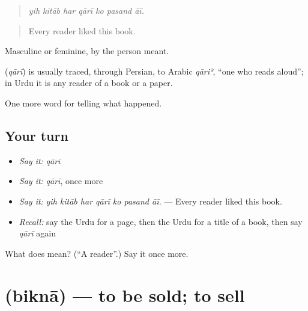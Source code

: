 \begin{quote}
      
\end{quote}

\begin{quote}
\emph{yih kitāb har qārī ko pasand āī.}
\end{quote}

\begin{quote}
Every reader liked this book.
\end{quote}

Masculine or feminine, by the person meant.

\begin{cousinweb}
\textbf{} (\emph{qārī}) is usually traced, through Persian, to Arabic \emph{qāriʾ}, \textquotedblleft{}one who reads aloud\textquotedblright{}; in Urdu it is any reader of a book or a paper.
\end{cousinweb}

\begin{grammarlens}[title={What you've built}]
One more word for telling what happened.
\end{grammarlens}

\subsection*{Your turn}
\begin{itemize}
\raggedright
  \item \emph{Say it:} \emph{qārī}
  \item \emph{Say it:} \emph{qārī}, once more
  \item \emph{Say it:} \emph{yih kitāb har qārī ko pasand āī.} — Every reader liked this book.
  \item \emph{Recall:} say the Urdu for a page, then the Urdu for a title of a book, then say \emph{qārī} again
\end{itemize}

\begin{tcolorbox}[breakable,colback=teal!4,colframe=teal!35!black,title={Before you move on}]
What does  mean? (\textquotedblleft{}A reader\textquotedblright{}.) Say it once more.
\end{tcolorbox}
\section[\texorpdfstring{\ur{بکنا} (biknā)}{بکنا (biknā)}]{ (biknā) — to be sold; to sell}

